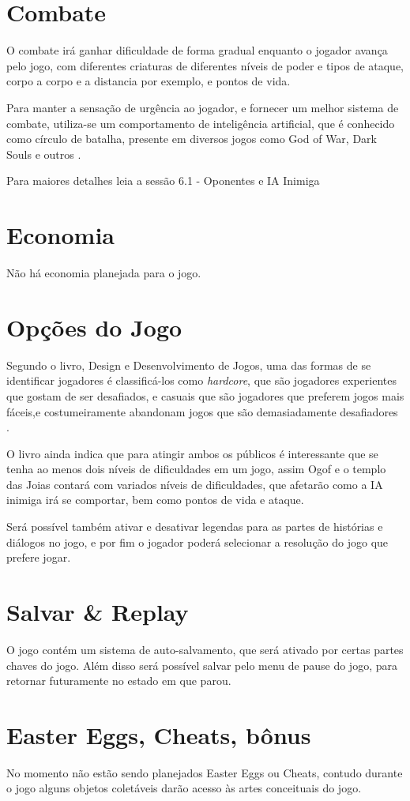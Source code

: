 \section{Combate}
O combate irá ganhar dificuldade de forma gradual enquanto o jogador avança pelo jogo, com diferentes criaturas de diferentes níveis de poder e tipos de ataque, corpo a corpo e a distancia por exemplo, e pontos de vida. 

Para manter a sensação de urgência ao jogador, e fornecer um melhor sistema de combate, utiliza-se um comportamento de inteligência artificial, que é conhecido como círculo de batalha, presente em diversos jogos como God of War, Dark Souls e outros \cite{BattleCi}.

Para maiores detalhes leia a sessão 6.1 - Oponentes e IA Inimiga

\section{Economia}

Não há economia planejada para o jogo.

\section{Opções do Jogo}

Segundo o livro, Design e Desenvolvimento de Jogos, uma das formas de se identificar jogadores é classificá-los como \textit{hardcore}, que são jogadores experientes que gostam de ser desafiados, e casuais que são jogadores que preferem jogos mais fáceis,e costumeiramente abandonam jogos que são demasiadamente desafiadores \cite{pradadesign}. 

O livro ainda indica que para atingir ambos os públicos é interessante que se tenha ao menos dois níveis de dificuldades em um jogo, assim Ogof e o templo das Joias contará com variados níveis de dificuldades, que afetarão como a IA inimiga irá se comportar, bem como pontos de vida e ataque.

Será possível também ativar e desativar legendas para as partes de histórias e diálogos no jogo, e por fim o jogador poderá selecionar a resolução do jogo que prefere jogar.

\section{Salvar \& Replay}

O jogo contém um sistema de auto-salvamento, que será ativado por certas partes chaves do jogo. Além disso será possível salvar pelo menu de pause do jogo, para retornar futuramente no estado em que parou.

\section{Easter Eggs, Cheats, bônus}

No momento não estão sendo planejados Easter Eggs ou Cheats, contudo durante o jogo alguns objetos coletáveis darão acesso às artes conceituais do jogo.

